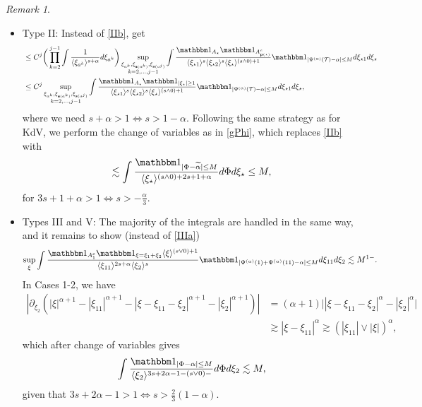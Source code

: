 \documentclass[%
11pt,  reqno]{amsart}
\newcommand{\5}{\textup{V}}
\newcommand{\ind}{\mathbbm 1}
\newcommand{\les}{\lesssim}
\newcommand{\wt}{\widetilde}
\theoremstyle{remark}
\newtheorem{remark}[theorem]{Remark}
\newcommand{\TT}{\mathcal{T}}
\newcommand{\al}{\alpha}
\newcommand{\pb}{\mathbf{p}}
\newcommand{\sbf}{\mathbf{s}}
\newcommand{\ges}{\gtrsim}
\newcommand{\jb}[1]
{\langle #1 \rangle}
\numberwithin{equation}{section}
\numberwithin{theorem}{section}
\begin{document}
\begin{remark}
\begin{itemize}
\item Type II: Instead of \eqref{IIb}, get
\begin{align}
&
\le C^j \bigg( \prod_{k=2}^{j-1} \int \frac{1}{ \jb{\xi_{a^{k}}}^{s+\al} } d\xi_{a^k} \bigg) \sup_{\substack{\xi_{a^k}, \xi_{\sbf(a^k)}, \xi_{\sbf(a^{j})} \\ k=2, \ldots, j-1}}
\int \frac{\ind_{A_\star} \ind_{A^c_{\pb(\star)}}}{ \jb{\xi_{\star1} }^s \jb{\xi_{\star2}}^s \jb{\xi_\star}^{(s\land0)+1}  } \ind_{|\Psi^{(\al)}(\TT) - \al| \le M} d\xi_{\star1} d\xi_{\star} 
\\
&
\le C^j 
\sup_{\substack{\xi_{a^k}, \xi_{\sbf(a^k)}, \xi_{\sbf(a^{j})} \\ k=2, \ldots, j-1}}
\int \frac{\ind_{A_\star} \ind_{|\xi_\star|\ge 1}}{ \jb{\xi_{\star1} }^s \jb{\xi_{\star2}}^s \jb{\xi_\star}^{(s\land0)+1}  } \ind_{|\Psi^{(\al)}(\TT) - \al| \le M} d\xi_{\star1} d\xi_{\star} , 
\end{align}
where we need $s+\al > 1 \iff s > 1 - \al$. Following the same strategy as for KdV, we perform the change of variables as in \eqref{gPhi}, which replaces \eqref{IIb} with
\begin{align}
\les \int \frac{\ind_{|\Phi - \wt\al| \le M} }{ \jb{\xi_\star}^{(s\land 0) + 2s + 1 +\al} } d\Phi d\xi_\star \le M , 
\end{align}
for $3s + 1 + \al > 1 \iff s > - \frac\al3$.  


\item Types III and V: The majority of the integrals are handled in the same way, and it remains to show (instead of \eqref{IIIa})
\begin{align}
\sup_\xi \int \frac{ \ind_{A_1^c} \ind_{\xi=\xi_1+\xi_2} \jb{\xi}^{(s\lor 0)+1}  }{ \jb{\xi_{11}}^{2s+\al}  \jb{\xi_{2}}^s }
\ind_{|\Psi^{(\al)}(1) + \Psi^{(\al)}(11) - \al| \le M}
d\xi_{11} d\xi_2 \les M^{1-}.
\end{align}
In Cases 1-2, we have
\begin{align}
| \partial_{\xi_2} ( |\xi|^{\al+1} - |\xi_{11}|^{\al+1} - |\xi-\xi_{11}-\xi_2|^{\al+1} - |\xi_2|^{\al+1}) |  & = (\al+1) \big| |\xi-\xi_{11} - \xi_2|^\al - |\xi_2|^\al \big| 
\\
&
\ges |\xi-\xi_{11}|^\al \ges( |\xi_{11}| \lor |\xi|)^\al, 
\end{align}
which after change of variables gives
\begin{align}
\int \frac{\ind_{| \Phi - \al | \le M }}{\jb{\xi_2}^{3s+2\al -1 - (s\lor 0) -  }} d\Phi d\xi_2 \les M, 
\end{align}
given that $3s+2\al -1> 1 \iff s > \frac23(1-\al)$. 


\end{itemize}
\end{remark}
\end{document}
